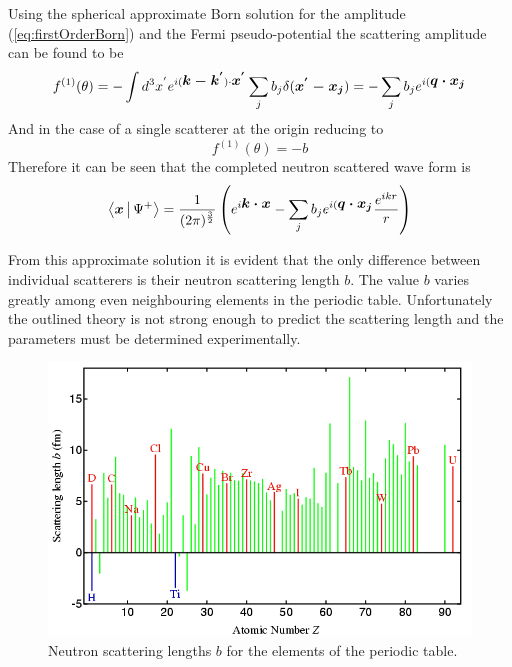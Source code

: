 Using the spherical approximate Born solution for the amplitude (\ref{eq:firstOrderBorn}) and the Fermi pseudo-potential the scattering amplitude can be found to be 
\begin{equation}
f^{(1)}(\theta) = -\int d^3x^{'}e^{i(\mbox{\boldmath$k-k^{'}$})\cdot \mbox{\boldmath$x^{'}$}}\sum\limits_{j} b_j \delta(\mbox{\boldmath$x^{'}-x_j$})=-\sum\limits_{j}b_j e^{i(\mbox{\boldmath$q \cdot x_j$}}
\label{eq:neutronScatteringAmplitude}
\end{equation}
And in the case of a single scatterer at the origin reducing to 
\begin{equation}
f^{(1)}(\theta)  = -b
\label{eq:neutronScatteringSingle}
\end{equation}
Therefore it can be seen that the completed neutron scattered wave form is
\begin{equation}
\label{eq:scatterNeutronWaveForm}
\Braket{\mbox{\boldmath$x$}|\Psi^{+}} = \frac{1}{(2\pi)^{\frac{3}{2}}}\left(e^{i\mbox{\boldmath$k \cdot x$}} - \sum\limits_{j}b_j e^{i(\mbox{\boldmath$q \cdot x_j$}}\frac{e^{ikr}}{r}\right)
\end{equation}

From this approximate solution it is evident that the only difference between individual scatterers is their neutron scattering length $b$. The value $b$ varies greatly among even neighbouring elements in the periodic table. Unfortunately the outlined theory is not strong enough to predict the scattering length and the parameters must be determined experimentally. 

\begin{figure}[ht!]
\centering
\includegraphics[scale=0.5]{Figures/neutronScatteringLength.png}
\caption{Neutron scattering lengths $b$ for the elements of the periodic table. \cite{scatteringlengths}}
\label{fig:scatteringLength}
\end{figure}

